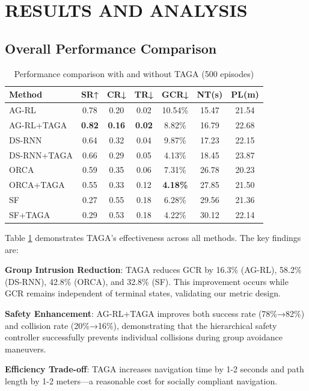 \section{RESULTS AND ANALYSIS}

\subsection{Overall Performance Comparison}

\begin{table}[t]
\caption{Performance comparison with and without TAGA (500 episodes)}
\label{table:main-results}
\centering
\begin{tabular}{lcccccc}
\hline
\textbf{Method} & \textbf{SR↑} & \textbf{CR↓} & \textbf{TR↓} & \textbf{GCR↓} & \textbf{NT(s)} & \textbf{PL(m)} \\
\hline
AG-RL & 0.78 & 0.20 & 0.02 & 10.54\% & 15.47 & 21.54 \\
AG-RL+TAGA & \textbf{0.82} & \textbf{0.16} & \textbf{0.02} & 8.82\% & 16.79 & 22.68 \\
\hline
DS-RNN & 0.64 & 0.32 & 0.04 & 9.87\% & 17.23 & 22.15 \\
DS-RNN+TAGA & 0.66 & 0.29 & 0.05 & 4.13\% & 18.45 & 23.87 \\
\hline
ORCA & 0.59 & 0.35 & 0.06 & 7.31\% & 26.78 & 20.23 \\
ORCA+TAGA & 0.55 & 0.33 & 0.12 & \textbf{4.18\%} & 27.85 & 21.50 \\
\hline
SF & 0.27 & 0.55 & 0.18 & 6.28\% & 29.56 & 21.36 \\
SF+TAGA & 0.29 & 0.53 & 0.18 & 4.22\% & 30.12 & 22.14 \\
\hline
\end{tabular}
\end{table}

Table \ref{table:main-results} demonstrates TAGA's effectiveness across all methods. The key findings are:

\textbf{Group Intrusion Reduction}: TAGA reduces GCR by 16.3\% (AG-RL), 58.2\% (DS-RNN), 42.8\% (ORCA), and 32.8\% (SF). This improvement occurs while GCR remains independent of terminal states, validating our metric design.

\textbf{Safety Enhancement}: AG-RL+TAGA improves both success rate (78\%→82\%) and collision rate (20\%→16\%), demonstrating that the hierarchical safety controller successfully prevents individual collisions during group avoidance maneuvers.

\textbf{Efficiency Trade-off}: TAGA increases navigation time by 1-2 seconds and path length by 1-2 meters—a reasonable cost for socially compliant navigation.

